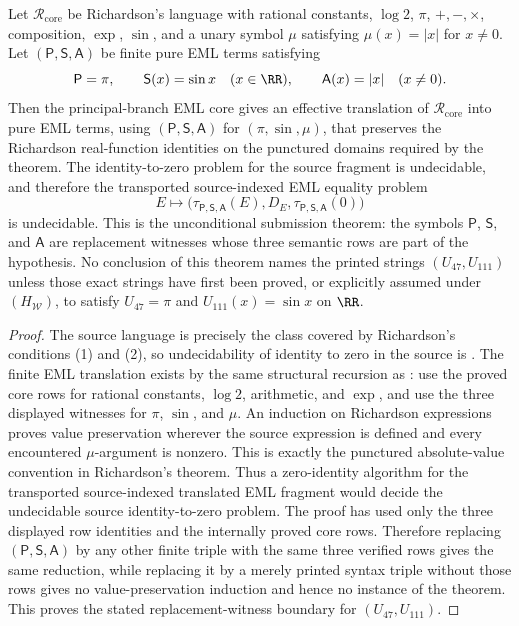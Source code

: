 \begin{theorem}
\label{thm:largest-verified-richardson-fragment}
\label{thm:replacement-triple-richardson-interface}
Let \(\mathcal R_{\mathrm{core}}\) be Richardson's language with rational
constants, \(\log2\), \(\pi\), \(+,-,\times\), composition, \(\exp\), \(\sin\), and
a unary symbol \(\mu\) satisfying \(\mu(x)=|x|\) for \(x\ne0\).  Let
\((\mathsf P,\mathsf S,\mathsf A)\) be finite pure EML terms satisfying
\[
  \mathsf P=\pi,
  \qquad \mathsf S(x)=\sin x\quad(x\in\RR),
  \qquad \mathsf A(x)=|x|\quad(x\ne0).
\]
Then the principal-branch EML core gives an effective translation of
\(\mathcal R_{\mathrm{core}}\) into pure EML terms, using
\((\mathsf P,\mathsf S,\mathsf A)\) for \((\pi,\sin,\mu)\), that preserves the
Richardson real-function identities on the punctured domains required by the
theorem.  The identity-to-zero problem for the source fragment is undecidable,
and therefore the transported source-indexed EML equality problem
\[
  E\longmapsto
  \bigl(\tau_{\mathsf P,\mathsf S,\mathsf A}(E),D_E,
  \tau_{\mathsf P,\mathsf S,\mathsf A}(0)\bigr)
\]
is undecidable.  This is the unconditional submission theorem: the symbols
\(\mathsf P\), \(\mathsf S\), and \(\mathsf A\) are replacement witnesses whose
three semantic rows are part of the hypothesis.  No conclusion of this theorem
names the printed strings \((U_{47},U_{111})\) unless those exact strings have
first been proved, or explicitly assumed under \((H_{\mathcal W})\), to satisfy
\(U_{47}=\pi\) and \(U_{111}(x)=\sin x\) on \(\RR\).
\end{theorem}

\begin{proof}
The source language is precisely the class covered by Richardson's conditions
(1) and (2), so undecidability of identity to zero in the source is
.  The finite EML translation exists by the same
structural recursion as : use the
proved core rows for rational constants, \(\log2\), arithmetic, and \(\exp\), and
use the three displayed witnesses for \(\pi\), \(\sin\), and \(\mu\).  An induction
on Richardson expressions proves value preservation wherever the source
expression is defined and every encountered \(\mu\)-argument is nonzero.  This is
exactly the punctured absolute-value convention in Richardson's theorem.  Thus a
zero-identity algorithm for the transported source-indexed translated EML
fragment would decide the undecidable source identity-to-zero problem.  The
proof has used only the three displayed row identities and the internally proved
core rows.  Therefore replacing \((\mathsf P,\mathsf S,\mathsf A)\) by any other
finite triple with the same three verified rows gives the same reduction, while
replacing it by a merely printed syntax triple without those rows gives no
value-preservation induction and hence no instance of the theorem.  This proves
the stated replacement-witness boundary for \((U_{47},U_{111})\).
\end{proof}


